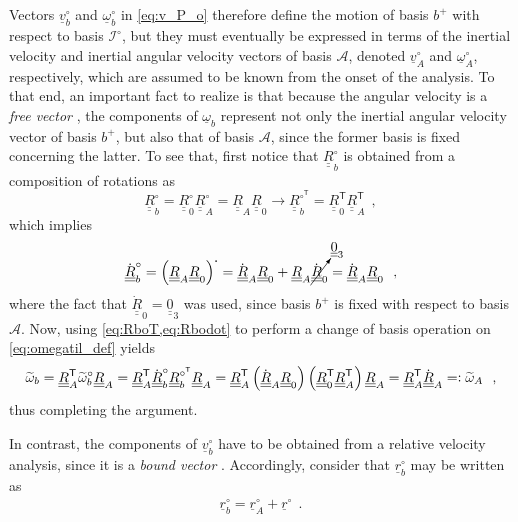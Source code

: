 \documentclass[12pt,a4paper,oneside,english]{abntex2} %
\newcommand{\eqdef}{=\vcentcolon}
\newcommand{\vect}[1]{\underline{#1}}
\def\tens#1{\underline{\underline{#1}}}
\def\til#1{\widetilde{#1}}
\def\lp{\left(}
\def\rp{\right)}
\def\T{\mathsf{T}}
\def\A{\mathcal{A}}
\def\bp{b^+}
\def\Io{\mathcal{I}^{\circ}}
\def\zthree{\tens{0}_3}
\def\dotout{^{\boldsymbol{\cdot}}}
\def\R{\tens{R}}
\def\Rbo{\R^{\circ}_b}
\def\RboT{\R^{\circ^\T}_b}
\def\Rbodot{\dot{\R}^{\circ}_b}
\def\Rz{\R_0}
\def\RzT{\R^\T_0}
\def\Rzo{\R^{\circ}_0}
\def\Rzdot{\dot{\R}_0}
\def\RA{\R_A}
\def\RAT{\R^\T_A}
\def\RAdot{\dot{\R}_A}
\def\RAo{\R^{\circ}_A}
\def\r{\vect{r}}
\def\ro{\r^{\circ}}
\def\rAo{\r^{\circ}_A}
\def\rbo{\vect{r}^{\circ}_b}
\def\vb{\vect{v}_b}
\def\vA{\vect{v}_A}
\def\vAo{\vA^{\circ}}
\def\vbo{\vb^{\circ}}
\def\om{\vect{\omega}_b}
\def\omA{\vect{\omega}_A}
\def\omAo{\omA^{\circ}}
\def\omAtil{\til{\omega}_A}
\def\omo{\om^{\circ}}
\def\omtil{\til{\omega}_b}
\def\omtilo{\omtil^{\circ}}
\begin{document}
Vectors $\vbo$ and $\omo$ in \cref{eq:v_P_o} therefore define the motion of basis $\bp$ with respect to basis $\Io$, but they must eventually be expressed in terms of the inertial velocity and inertial angular velocity vectors of basis $\A$, denoted $\vAo$ and $\omAo$, respectively, which are assumed to be known from the onset of the analysis. To that end, an important fact to realize is that because the angular velocity is a \textit{free vector} \cite{bauchau2011flexible}, the components of $\om$ represent not only the inertial angular velocity vector of basis $\bp$, but also that of basis $\A$, since the former basis is fixed concerning the latter. To see that, first notice that $\Rbo$ is obtained from a composition of rotations as 
\begin{equation}
    \Rbo = \Rzo\RAo = \RA\Rz \rightarrow \RboT = \RzT\RAT \ \ ,
    \label{eq:RboT}
\end{equation}
which implies
\begin{align}
    \Rbodot = \lp\RA\Rz\rp\dotout = \RAdot\Rz + \RA\cancelto{\zthree}{\Rzdot} = \RAdot\Rz \ \ ,
    \label{eq:Rbodot}
\end{align}
where the fact that $\Rzdot = \zthree$ was used, since basis $\bp$ is fixed with respect to basis $\A$. Now, using \cref{eq:RboT,eq:Rbodot} to perform a change of basis operation on \cref{eq:omegatil_def} yields
\begin{align}
    \omtil = \RAT\omtilo\RA = \RAT\Rbodot\RboT\RA =
    \RAT\lp\RAdot\Rz\rp\lp\RzT\RAT\rp\RA = \RAT\RAdot \eqdef \omAtil \ \ ,
    \label{eq:omtilo_omtilA}
\end{align}
thus completing the argument. 

In contrast, the components of $\vbo$ have to be obtained from a relative velocity analysis, since it is a \textit{bound vector} \cite{bauchau2011flexible}. Accordingly, consider that $\rbo$ may be written as
\begin{align}
    \rbo = \rAo + \ro \ \ .
    \label{eq:rbo}
\end{align}
\end{document}
